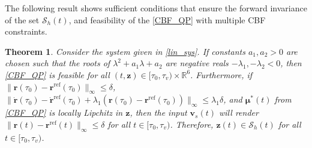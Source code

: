 \documentclass[journal,10pt]{IEEEtran}
\newtheorem{theorem}{\bfseries Theorem}
\newcommand{\vect}[1]{\boldsymbol{\mathbf{#1}}}
\newcommand{\la}{\lambda}
\newif\ifdraft
\newcommand{\XX}[1]{\ifdraft{\color{red}[{\bf XX}: #1]}\fi}
\newcommand{\VF}[1]{\ifdraft{\color{blue}[{\bf VF}: #1]}\fi}
\begin{document}
The following result shows sufficient conditions that ensure the forward invariance of the set $\mathcal{S}_h(t)$, and feasibility of the \eqref{CBF_QP} with multiple CBF constraints.


\begin{theorem} \label{CBF_QP_Feasibility}
Consider the system given in \eqref{lin_sys}. If constants $a_1,a_2>0$ are chosen such that  the roots of $\la^2+a_1\la+a_2$ are negative reals $-\lambda_1,-\lambda_2<0$, 
then \eqref{CBF_QP} is  feasible for all $(t,\vect{z})\in[\tau_0,\tau_v)\times\mathbb{R}^6$. Furthermore, if 
$\|\vect{r}(\tau_0)-\vect{r}^{\text{ref}}(\tau_0) \|_{\infty} \leq \delta$, $\|\dot{\vect{r}}(\tau_0)-\dot{\vect{r}}^{\text{ref}}(\tau_0)+\lambda_1(\vect{r}(\tau_0)-\vect{r}^{\text{ref}}(\tau_0)) \|_{\infty} \leq \lambda_1\delta$,
and $\vect{\mu}^*(t)$ from \eqref{CBF_QP} is locally Lipchitz in $\vect{z}$, then the input $\vect{v}_s(t)$  will render $\|\vect{r}(t)-\vect{r}^{\text{ref}}(t) \|_{\infty} \leq \delta$ for all $t \in [\tau_0,\tau_v)$. Therefore, $\vect{z}(t)\in\mathcal{S}_h(t)$ for all $t\in[\tau_0,\tau_v)$.
\end{theorem}
\end{document}
